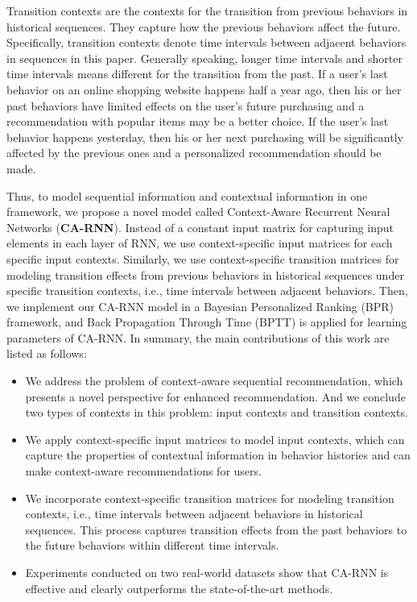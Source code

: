 \documentclass{sig-alternate}
\begin{document}
Transition contexts are the contexts for the transition from previous behaviors in historical sequences. They capture how the previous behaviors affect the future. Specifically, transition contexts denote time intervals between adjacent behaviors in sequences in this paper. Generally speaking, longer time intervals and shorter time intervals means different for the transition from the past. If a user's last behavior on an online shopping website happens half a year ago, then his or her past behaviors have limited effects on the user's future purchasing and a recommendation with popular items may be a better choice. If the user's last behavior happens yesterday, then his or her next purchasing will be significantly affected by the previous ones and a personalized recommendation should be made.

Thus, to model sequential information and contextual information in one framework, we propose a novel model called Context-Aware Recurrent Neural Networks (\textbf{CA-RNN}). Instead of a constant input matrix for capturing input elements in each layer of RNN, we use context-specific input matrices for each specific input contexts. Similarly, we use context-specific transition matrices for modeling transition effects from previous behaviors in historical sequences under specific transition contexts, i.e., time intervals between adjacent behaviors. Then, we implement our CA-RNN model in a Bayesian Personalized Ranking (BPR) \cite{rendle2009bpr} framework, and Back Propagation Through Time (BPTT) \cite{rumelhart1988learning} is applied for learning parameters of CA-RNN. In summary, the main contributions of this work are listed as follows:

\begin{itemize}
\item
We address the problem of context-aware sequential recommendation, which presents a novel perspective for enhanced recommendation. And we conclude two types of contexts in this problem: input contexts and transition contexts.

\item
We apply context-specific input matrices to model input contexts, which can capture the properties of contextual information in behavior histories and can make context-aware recommendations for users.

\item
We incorporate context-specific transition matrices for modeling transition contexts, i.e., time intervals between adjacent behaviors in historical sequences. This process captures transition effects from the past behaviors to the future behaviors within different time intervals.

\item
Experiments conducted on two real-world datasets show that CA-RNN is effective and clearly outperforms the state-of-the-art methods.

\end{itemize}
\end{document}
